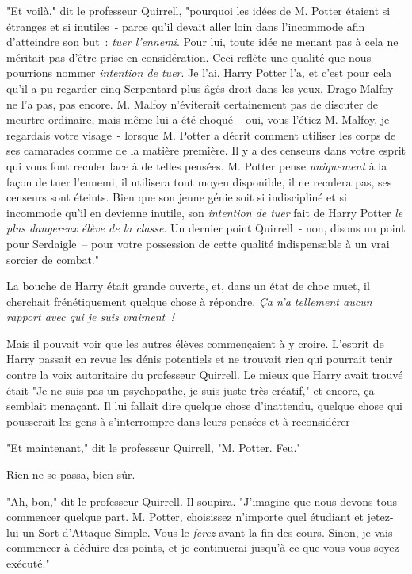 "Et voilà," dit le professeur Quirrell, "pourquoi les idées de M. Potter étaient si étranges et si inutiles~- parce qu'il devait aller loin dans l'incommode afin d'atteindre son but~: \emph{tuer l'ennemi}. Pour lui, toute idée ne menant pas à cela ne méritait pas d'être prise en considération. Ceci reflète une qualité que nous pourrions nommer \emph{intention de tuer}. Je l'ai. Harry Potter l'a, et c'est pour cela qu'il a pu regarder cinq Serpentard plus âgés droit dans les yeux. Drago Malfoy ne l'a pas, pas encore. M. Malfoy n'éviterait certainement pas de discuter de meurtre ordinaire, mais même lui a été choqué~- oui, vous l'étiez M. Malfoy, je regardais votre visage~- lorsque M. Potter a décrit comment utiliser les corps de ses camarades comme de la matière première. Il y a des censeurs dans votre esprit qui vous font reculer face à de telles pensées. M. Potter pense \emph{uniquement} à la façon de tuer l'ennemi, il utilisera tout moyen disponible, il ne reculera pas, ses censeurs sont éteints. Bien que son jeune génie soit si indiscipliné et si incommode qu'il en devienne inutile, son \emph{intention de tuer} fait de Harry Potter \emph{le plus dangereux élève de la classe}. Un dernier point Quirrell~- non, disons un point pour Serdaigle~-- pour votre possession de cette qualité indispensable à un vrai sorcier de combat."

La bouche de Harry était grande ouverte, et, dans un état de choc muet, il cherchait frénétiquement quelque chose à répondre. \emph{Ça n'a tellement aucun rapport avec qui je suis vraiment~!}

Mais il pouvait voir que les autres élèves commençaient à y croire. L'esprit de Harry passait en revue les dénis potentiels et ne trouvait rien qui pourrait tenir contre la voix autoritaire du professeur Quirrell. Le mieux que Harry avait trouvé était "Je ne suis pas un psychopathe, je suis juste très créatif," et encore, ça semblait menaçant. Il lui fallait dire quelque chose d'inattendu, quelque chose qui pousserait les gens à s'interrompre dans leurs pensées et à reconsidérer~-

"Et maintenant," dit le professeur Quirrell, "M. Potter. Feu."

Rien ne se passa, bien sûr.

"Ah, bon," dit le professeur Quirrell. Il soupira. "J'imagine que nous devons tous commencer quelque part. M. Potter, choisissez n'importe quel étudiant et jetez-lui un Sort d'Attaque Simple. Vous le \emph{ferez} avant la fin des cours. Sinon, je vais commencer à déduire des points, et je continuerai jusqu'à ce que vous vous soyez exécuté."

